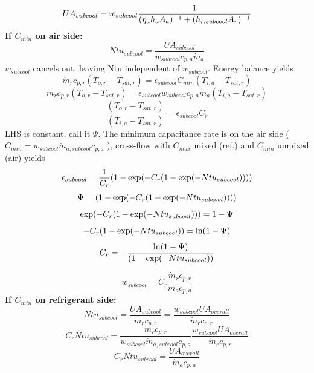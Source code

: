 \documentclass[]{article}
\begin{document}
\begin{equation}
UA_{subcool} =w_{subcool}\dfrac{1}{  (\eta_a h_a A_{a})^{-1} + (h_{r,subcool} A_{r})^{-1}}\\
\end{equation}
\textbf{If $C_{min}$ on air side:}
\begin{equation}
Ntu_{subcool} = \frac{UA_{subcool}}{w_{subcool}c_{p,a}  \dot m_{a}}
\end{equation}
$w_{subcool}$ cancels out, leaving Ntu independent of $w_{subcool}$.  Energy balance yields
\begin{equation}
\dot m_rc_{p,r}(T_{o,r}-T_{sat,r})=\epsilon_{subcool} C_{min} (T_{i,a}-T_{sat,r})
\end{equation}
\begin{equation}
\dot m_rc_{p,r}(T_{o,r}-T_{sat,r})=\epsilon_{subcool} w_{subcool} c_{p,a}  \dot m_{a} (T_{i,a}-T_{sat,r})
\end{equation}
\begin{equation}
\frac{(T_{o,r}-T_{sat,r})}{(T_{i,a}-T_{sat,r})}=\epsilon_{subcool}C_r
\end{equation}
LHS is constant, call it $\Psi$.  The minimum capacitance rate is on the air side ($C_{min}=  w_{subcool}\dot m_{a,subcool} c_{p,a}$ ), cross-flow with $C_{max}$ mixed (ref.) and $C_{min}$ unmixed (air) yields
\begin{equation}
\epsilon_{subcool} = \displaystyle\frac{1}{C_r} (1 - \exp(-C_r (1 - \exp(-Ntu_{subcool}))))\\
\end{equation}
\begin{equation}
\Psi = (1 - \exp(-C_r (1 - \exp(-Ntu_{subcool}))))\\
\end{equation}
\begin{equation}
\exp(-C_r (1 - \exp(-Ntu_{subcool}))) = 1 - \Psi\\
\end{equation}
\begin{equation}
-C_r (1 - \exp(-Ntu_{subcool})) = \ln(1 - \Psi)\\
\end{equation}
\begin{equation}
C_r  = -\frac{\ln(1 - \Psi)}{(1 - \exp(-Ntu_{subcool}))}\\
\end{equation}

\begin{equation}
w_{subcool}=C_r\frac{\dot m_rc_{p,r}}{\dot m_{a} c_{p,a}}
\end{equation}
\textbf{If $C_{min}$ on refrigerant side:}
\begin{equation}
Ntu_{subcool} = \frac{UA_{subcool}}{\dot m_r c_{p,r}}=\frac{w_{subcool}UA_{overall}}{\dot m_r c_{p,r}}
\end{equation}
\begin{equation}
C_rNtu_{subcool} = \frac{m_r c_{p,r}}{w_{subcool}\dot m_{a,subcool} c_{p,a}}\frac{w_{subcool}UA_{overall}}{\dot m_r c_{p,r}}
\end{equation}
\begin{equation}
C_rNtu_{subcool} = \frac{UA_{overall}}{\dot m_a c_{p,a}}
\end{equation}
\end{document}

